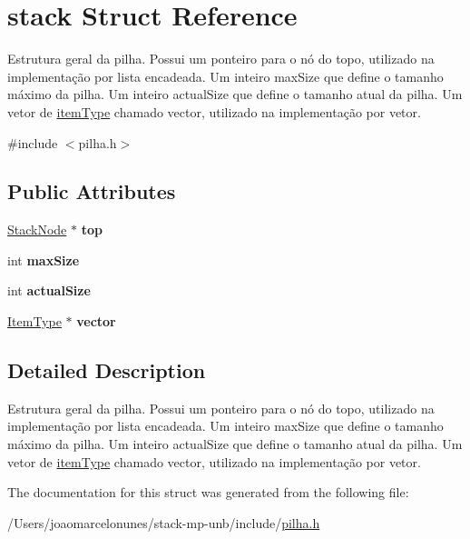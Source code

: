 \hypertarget{structstack}{}\section{stack Struct Reference}
\label{structstack}


Estrutura geral da pilha. Possui um ponteiro para o nó do topo, utilizado na implementação por lista encadeada. Um inteiro max\+Size que define o tamanho máximo da pilha. Um inteiro actual\+Size que define o tamanho atual da pilha. Um vetor de \mbox{\hyperlink{structitem_type}{item\+Type}} chamado vector, utilizado na implementação por vetor.  




{\ttfamily \#include $<$pilha.\+h$>$}

\subsection*{Public Attributes}
\begin{DoxyCompactItemize}
\item 
\mbox{\label{structstack_ad01ff81917edb47649353b817b4f1877}} 
\mbox{\hyperlink{pilha_8h_aa2b918390d6428b82c080bb2b136e639}{Stack\+Node}} $\ast$ {\bfseries top}
\item 
\mbox{\label{structstack_ade3c9eb96c63585ca70165e4a36b6de1}} 
int {\bfseries max\+Size}
\item 
\mbox{\label{structstack_a10efb92f22b617e62f17971cfa3304ce}} 
int {\bfseries actual\+Size}
\item 
\mbox{\label{structstack_a539c4c8f614e8e478abdc73922be38b6}} 
\mbox{\hyperlink{pilha_8h_ae525c0f6c68dcd67700d0895c747ada4}{Item\+Type}} $\ast$ {\bfseries vector}
\end{DoxyCompactItemize}


\subsection{Detailed Description}
Estrutura geral da pilha. Possui um ponteiro para o nó do topo, utilizado na implementação por lista encadeada. Um inteiro max\+Size que define o tamanho máximo da pilha. Um inteiro actual\+Size que define o tamanho atual da pilha. Um vetor de \mbox{\hyperlink{structitem_type}{item\+Type}} chamado vector, utilizado na implementação por vetor. 



The documentation for this struct was generated from the following file\+:\begin{DoxyCompactItemize}
\item 
/\+Users/joaomarcelonunes/stack-\/mp-\/unb/include/\mbox{\hyperlink{pilha_8h}{pilha.\+h}}\end{DoxyCompactItemize}

